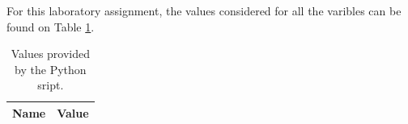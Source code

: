
\vspace{1cm}

For this laboratory assignment, the values considered for all the varibles can be
found on Table \ref{tab:given_vls}. 

\begin{table}[h]
	\centering
	\begin{tabular}{|l|r|}
		\hline    
		{\bf Name} & {\bf Value} \\ \hline
    		
	\end{tabular}
	
	\caption{Values provided by the Python sript.}
    
\label{tab:given_vls}
\end{table}

